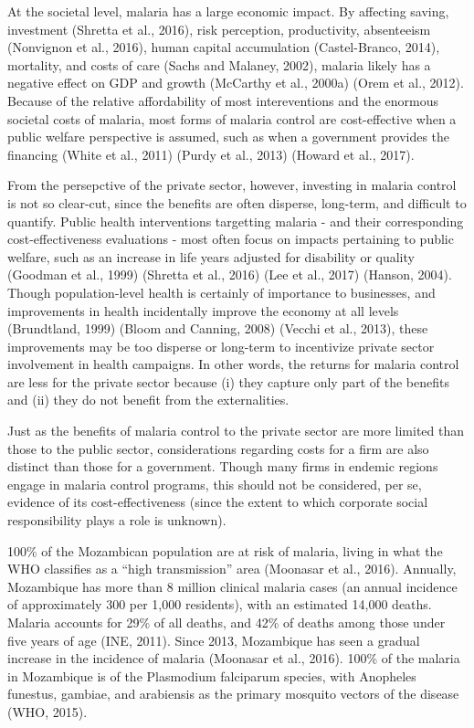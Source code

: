 \documentclass[]{article}
\begin{document}
At the societal level, malaria has a large economic impact. By affecting
saving, investment (Shretta et al., 2016), risk perception,
productivity, absenteeism (Nonvignon et al., 2016), human capital
accumulation (Castel-Branco, 2014), mortality, and costs of care (Sachs
and Malaney, 2002), malaria likely has a negative effect on GDP and
growth (McCarthy et al., 2000a) (Orem et al., 2012). Because of the
relative affordability of most intereventions and the enormous societal
costs of malaria, most forms of malaria control are cost-effective when
a public welfare perspective is assumed, such as when a government
provides the financing (White et al., 2011) (Purdy et al., 2013) (Howard
et al., 2017).

From the persepctive of the private sector, however, investing in
malaria control is not so clear-cut, since the benefits are often
disperse, long-term, and difficult to quantify. Public health
interventions targetting malaria - and their corresponding
cost-effectiveness evaluations - most often focus on impacts pertaining
to public welfare, such as an increase in life years adjusted for
disability or quality (Goodman et al., 1999) (Shretta et al., 2016) (Lee
et al., 2017) (Hanson, 2004). Though population-level health is
certainly of importance to businesses, and improvements in health
incidentally improve the economy at all levels (Brundtland, 1999) (Bloom
and Canning, 2008) (Vecchi et al., 2013), these improvements may be too
disperse or long-term to incentivize private sector involvement in
health campaigns. In other words, the returns for malaria control are
less for the private sector because (i) they capture only part of the
benefits and (ii) they do not benefit from the externalities.

Just as the benefits of malaria control to the private sector are more
limited than those to the public sector, considerations regarding costs
for a firm are also distinct than those for a government. Though many
firms in endemic regions engage in malaria control programs, this should
not be considered, per se, evidence of its cost-effectiveness (since the
extent to which corporate social responsibility plays a role is
unknown).

100\% of the Mozambican population are at risk of malaria, living in
what the WHO classifies as a ``high transmission'' area (Moonasar et
al., 2016). Annually, Mozambique has more than 8 million clinical
malaria cases (an annual incidence of approximately 300 per 1,000
residents), with an estimated 14,000 deaths. Malaria accounts for 29\%
of all deaths, and 42\% of deaths among those under five years of age
(INE, 2011). Since 2013, Mozambique has seen a gradual increase in the
incidence of malaria (Moonasar et al., 2016). 100\% of the malaria in
Mozambique is of the Plasmodium falciparum species, with Anopheles
funestus, gambiae, and arabiensis as the primary mosquito vectors of the
disease (WHO, 2015).
\end{document}
